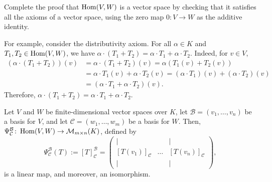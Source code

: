 \begin{exercise}
  Complete the proof that $\operatorname{Hom}(V,W)$ is a vector space by checking that it satisfies all the axioms of a vector space, using the zero map $0 \colon V \to W$ as the additive identity.
\end{exercise}

For example, consider the distributivity axiom. For all $\alpha \in K$ and $T_1, T_2 \in \operatorname{Hom}(V,W)$, we have $\alpha \cdot (T_1 + T_2) = \alpha \cdot T_1 + \alpha \cdot T_2$. Indeed, for $v \in V$,
\begin{align*}
  (\alpha \cdot (T_1 + T_2))(v) &= \alpha \cdot (T_1 + T_2)(v) = \alpha(T_1(v) + T_2(v)) \\
  &= \alpha \cdot T_1(v) + \alpha \cdot T_2(v) = (\alpha \cdot T_1)(v) + (\alpha \cdot T_2)(v) \\
  &= (\alpha \cdot T_1 + \alpha \cdot T_2)(v).
\end{align*}
Therefore, $\alpha \cdot (T_1 + T_2) = \alpha \cdot T_1 + \alpha \cdot T_2$.

\begin{theorem}
  Let $V$ and $W$ be finite-dimensional vector spaces over $K$, let $\mathcal{B} = (v_1, \dots, v_n)$ be a basis for $V$, and let $\mathcal{C} = (w_1, \dots, w_m)$ be a basis for $W$. Then, $\Psi_{\mathcal{C}}^{\mathcal{B}} \colon \operatorname{Hom}(V,W) \to \mathcal{M}_{m \times n}(K)$, defined by
  \[ \Psi_{\mathcal{C}}^{\mathcal{B}}(T) := [T]_{\mathcal{C}}^{\mathcal{B}} = \begin{pmatrix} | & & | \\ [T(v_1)]_{\mathcal{C}} & \dots & [T(v_n)]_{\mathcal{C}} \\ | & & | \end{pmatrix}, \]
  is a linear map, and moreover, an isomorphism.
\end{theorem}

